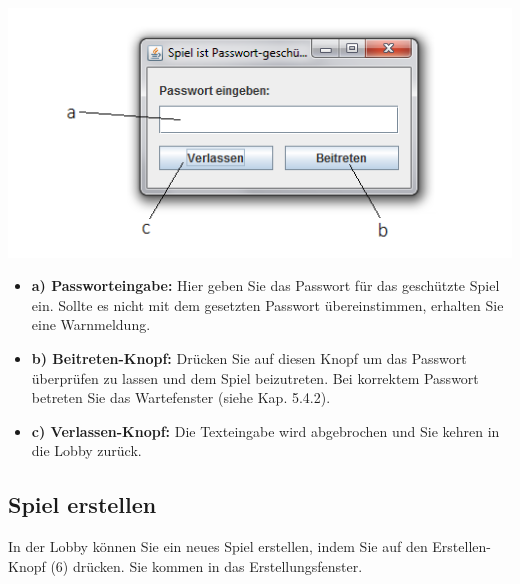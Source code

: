 \documentclass[titlepage,10pt,a4paper]{article}
\begin{document}
\begin{itemize}
\includegraphics[width=\textwidth]{Passwort-Fenster}
\begin{itemize}
		\item \textbf{a) Passworteingabe:} Hier geben Sie das Passwort für das geschützte Spiel ein. Sollte es nicht mit dem gesetzten Passwort übereinstimmen, erhalten Sie eine Warnmeldung.
		\item \textbf{b) Beitreten-Knopf:} Drücken Sie auf diesen Knopf um das Passwort überprüfen zu lassen und dem Spiel beizutreten. Bei korrektem Passwort betreten Sie das \gls{Wartefenster} (siehe Kap. 5.4.2).
		\item \textbf{c) Verlassen-Knopf:} Die Texteingabe wird abgebrochen und Sie kehren in die \gls{Lobby} zurück.
\end{itemize}
\end{itemize}
\subsection{Spiel erstellen}
In der Lobby können Sie ein neues Spiel erstellen, indem Sie auf den Erstellen-Knopf (6)  drücken. Sie kommen in das \gls{Erstellungsfenster}.\\
\end{document}
